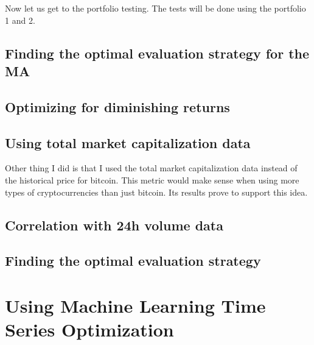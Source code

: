 Now let us get to the portfolio testing. The tests will be done using the portfolio 1 and 2.






\subsection*{Finding the optimal evaluation strategy for the MA}

\subsection*{Optimizing for diminishing returns}

\subsection*{Using total market capitalization data}
Other thing I did is that I used the total market capitalization data instead of the historical price for bitcoin. This metric would make sense when using more types of cryptocurrencies than just bitcoin. Its results prove to support this idea.

\subsection*{Correlation with 24h volume data}

\subsection*{Finding the optimal evaluation strategy}

\section{Using Machine Learning Time Series Optimization}

